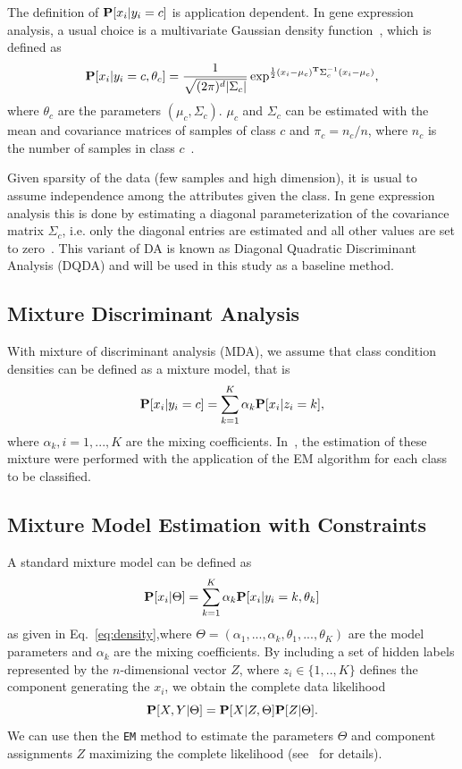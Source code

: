 \documentclass[runningheads,a4paper]{llncs}
\newcommand{\Prob}{\mbox{\bf P}}
\begin{document}
The definition of $\Prob[x_i|y_i=c]$ is application dependent.  In
gene expression analysis, a usual choice is a multivariate Gaussian
density function~\cite{Dudoit2002}, which is defined as
\begin{equation}
\label{eq:gaussian}
\Prob[x_i|y_i=c,\theta_c] = \frac{1}{\sqrt{(2\pi)^d |\Sigma_c|}} \exp^{\frac{1}{2}(x_i - \mu_c)^\mathbf{T}\Sigma_c^{-1}(x_i - \mu_c)},
\end{equation}
where $\theta_c$ are the parameters $(\mu_c,\Sigma_c)$. $\mu_c$ and
$\Sigma_c$ can be estimated with the mean and covariance matrices of
samples of class $c$ and $\pi_c=n_c/n$, where $n_c$ is the number of samples
in class $c$~\cite{Hastie2001}.

Given sparsity of the data (few samples and high dimension), it is
usual to assume independence among the attributes given the class.
In gene expression analysis this is done by estimating a diagonal
parameterization of the covariance matrix $\Sigma_c$, i.e.  only the
diagonal entries are estimated and all other values are set to
zero~\cite{Dudoit2002}. This variant of DA is known as Diagonal
Quadratic Discriminant Analysis (DQDA) and will be used in this study
as a baseline method.

\subsection{Mixture Discriminant Analysis}

With mixture of discriminant analysis (MDA), we assume that class
condition densities can be defined as a mixture model, that is
\begin{equation}
\label{eq:mixture}
\Prob[x_i|y_i=c] = \sum_{k=1}^K \alpha_k \Prob[x_i|z_i=k],
\end{equation}
where $\alpha_k,i=1,...,K$ are the mixing coefficients.
In~\cite{Hastie1996}, the estimation of these mixture were performed
with the application of the EM algorithm for each class to be
classified. 


\subsection{Mixture Model Estimation with Constraints\label{sc:mmec}}

A standard mixture model can be defined as 
\begin{equation}
\label{eq:density}
\Prob[x_i|\Theta] = \sum_{k=1}^K \alpha_k \Prob[x_i|y_i=k,\theta_k]
\end{equation}
as given in Eq.~\ref{eq:density},where $\Theta = (\alpha_1, ..., \alpha_k, \theta_1, ..., \theta_K)$
are the model parameters and $\alpha_k$ are the mixing coefficients.
By including a set of hidden labels represented by the $n$-dimensional
vector $Z$, where $z_i
\in \{1,..,K\}$ defines the component generating the $x_i$, we obtain
the complete data likelihood
\begin{equation}
\label{eq:likelihood}
\Prob[X,Y|\Theta] = \Prob[X|Z,\Theta] \Prob[Z|\Theta].
\end{equation}
We can use then the {\tt EM} method to estimate the parameters
$\Theta$ and component assignments $Z$ maximizing the complete
likelihood (see~\cite{MacLachlan2000} for details).
\end{document}
